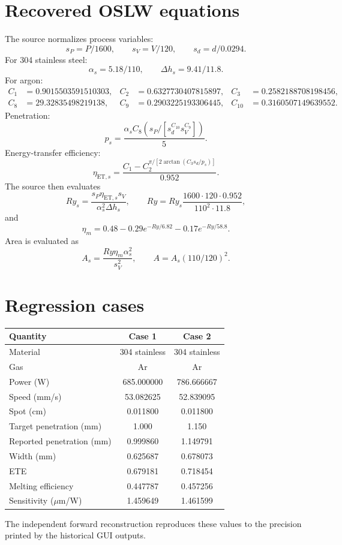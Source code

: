 \documentclass[11pt,a4paper]{article}
\begin{document}
\section{Recovered OSLW equations}
The source normalizes process variables:
\begin{equation}
s_P=P/1600,\qquad s_V=V/120,\qquad s_d=d/0.0294.
\end{equation}
For 304 stainless steel:
\begin{equation}
\alpha_s=5.18/110,\qquad \Delta h_s=9.41/11.8.
\end{equation}
For argon:
\begin{align}
C_1&=0.9015503591510303,&C_2&=0.6327730407815897,&C_3&=0.2582188708198456,\\
C_8&=29.32835498219138,&C_9&=0.2903225193306445,&C_{10}&=0.3160507149639552.
\end{align}
Penetration:
\begin{equation}
p_s=\frac{\alpha_s C_8(s_P/[s_d^{C_{10}}s_V^{C_9}])}{5}.
\end{equation}
Energy-transfer efficiency:
\begin{equation}
\eta_{\mathrm{ET},s}=
\frac{C_1-C_2^{\pi/[2\arctan(C_3s_d/p_s)]}}{0.952}.
\end{equation}
The source then evaluates
\begin{equation}
Ry_s=\frac{s_P\eta_{\mathrm{ET},s}s_V}{\alpha_s^2\Delta h_s},
\qquad
Ry=Ry_s\frac{1600\cdot120\cdot0.952}{110^2\cdot11.8},
\end{equation}
and
\begin{equation}
\eta_m=0.48-0.29e^{-Ry/6.82}-0.17e^{-Ry/58.8}.
\end{equation}
Area is evaluated as
\begin{equation}
A_s=\frac{Ry\eta_m\alpha_s^2}{s_V^2},
\qquad A=A_s(110/120)^2.
\end{equation}
\section{Regression cases}
\begin{center}
\begin{tabular}{lcc}
\toprule Quantity & Case 1 & Case 2\\ \midrule
Material & 304 stainless & 304 stainless\\
Gas & Ar & Ar\\
Power (W) & 685.000000 & 786.666667\\
Speed (mm/s) & 53.082625 & 52.839095\\
Spot (cm) & 0.011800 & 0.011800\\
Target penetration (mm) & 1.000 & 1.150\\
Reported penetration (mm) & 0.999860 & 1.149791\\
Width (mm) & 0.625687 & 0.678073\\
ETE & 0.679181 & 0.718454\\
Melting efficiency & 0.447787 & 0.457256\\
Sensitivity ($\mu$m/W) & 1.459649 & 1.461599\\
\bottomrule
\end{tabular}
\end{center}
The independent forward reconstruction reproduces these values to the precision
printed by the historical GUI outputs.
\end{document}
